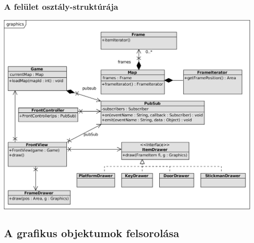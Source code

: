 		\subsubsection{A felület osztály-struktúrája}
			
	    \begin{center}
		    \includegraphics[scale=0.88]{resources/graphics.png}
	    \end{center}

	\subsection{A grafikus objektumok felsorolása}
	
